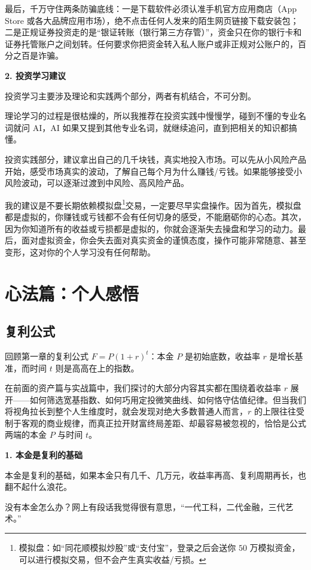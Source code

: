 \documentclass[12pt,openany]{book}
\newcommand{\subhead}[1]{%
    \par\vspace{0.5\baselineskip}%
    \noindent\textbf{#1}\par%
    \vspace{0.5\baselineskip}%
}
\begin{document}
最后，千万守住两条防骗底线：一是下载软件必须认准手机官方应用商店（App Store 或各大品牌应用市场），绝不点击任何人发来的陌生网页链接下载安装包；二是正规证券投资走的是“银证转账（银行第三方存管）”，资金只在你的银行卡和证券托管账户之间划转。任何要求你把资金转入私人账户或非正规对公账户的，百分之百是诈骗。

\subhead{2. 投资学习建议}

投资学习主要涉及理论和实践两个部分，两者有机结合，不可分割。 

理论学习的过程是很枯燥的，所以我推荐在投资实践中慢慢学，碰到不懂的专业名词就问 AI，AI 如果又提到其他专业名词，就继续追问，直到把相关的知识都搞懂。

投资实践部分，建议拿出自己的几千块钱，真实地投入市场。可以先从小风险产品开始，感受市场真实的波动，了解自己每个月为什么赚钱/亏钱。如果能够接受小风险波动，可以逐渐过渡到中风险、高风险产品。

我的建议是不要长期依赖模拟盘\footnote{模拟盘：如“同花顺模拟炒股”或“支付宝”，登录之后会送你 $50$ 万模拟资金，可以进行模拟交易，但不会产生真实收益/亏损。}交易，一定要尽早实盘操作。因为首先，模拟盘都是虚拟的，你赚钱或亏钱都不会有任何切身的感受，不能磨砺你的心态。其次，因为你知道所有的收益或亏损都是虚拟的，你就会逐渐失去操盘和学习的动力。最后，面对虚拟资金，你会失去面对真实资金的谨慎态度，操作可能非常随意、甚至变形，这对你的个人学习没有任何帮助。


\chapter{心法篇：个人感悟}

\section{复利公式}

回顾第一章的复利公式 $F = P(1+r)^t$：本金 $P$ 是初始底数，收益率 $r$ 是增长基准，而时间 $t$ 则是高高在上的指数。

在前面的资产篇与实战篇中，我们探讨的大部分内容其实都在围绕着收益率 $r$ 展开——如何筛选宽基指数、如何巧用定投微笑曲线、如何恪守估值纪律。但当我们将视角拉长到整个人生维度时，就会发现对绝大多数普通人而言，$r$ 的上限往往受制于客观的商业规律，而真正拉开财富终局差距、却最容易被忽视的，恰恰是公式两端的本金 $P$ 与时间 $t$。

\subhead{1. 本金是复利的基础}

本金是复利的基础，如果本金只有几千、几万元，收益率再高、复利周期再长，也翻不起什么浪花。

没有本金怎么办？网上有段话我觉得很有意思，“一代工科，二代金融，三代艺术。”
\end{document}
